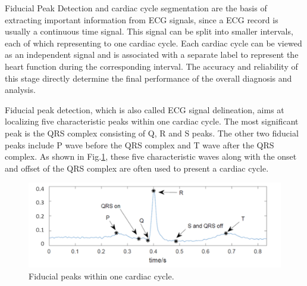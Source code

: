 Fiducial Peak Detection and cardiac cycle segmentation are the basis of extracting important information from ECG signals, since a ECG record is usually a continuous time signal. This signal can be split into smaller intervals, each of which representing to one cardiac cycle. Each cardiac cycle can be viewed as an independent signal and is associated with a separate label to represent the heart function during the corresponding interval. %
The accuracy and reliability of this stage directly determine the final performance of the overall diagnosis and analysis. 

Fiducial peak detection, which is also called ECG signal delineation, aims at localizing five characteristic peaks within one cardiac cycle. The most significant peak is the QRS complex consisting of Q, R and S peaks. The other two fiducial peaks include P wave before the QRS complex and T wave after the QRS complex. As shown in Fig.\ref{fig:fiducial_peaks}, these five characteristic waves along with the onset and offset of the QRS complex are often used to present a cardiac cycle.

 \begin{figure}[thpb]
 	\centering
 	\includegraphics[scale=0.7]{Fig/fiducial_peaks2.png}  
 	\caption{Fiducial peaks within one cardiac cycle.}
 	\label{fig:fiducial_peaks}
 \end{figure}
 
